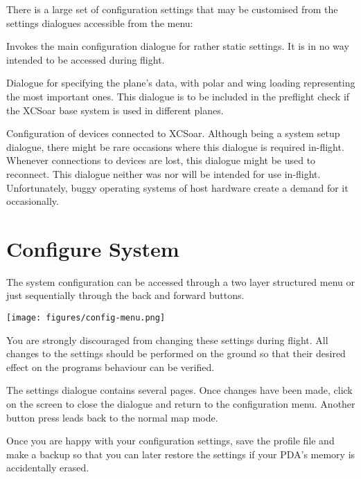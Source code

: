 There is a large set of configuration settings that may be customised
from the settings dialogues accessible from the menu:
\begin{jspecs}
\item[\bmenug{Config 2/3}\blink\bmenug{System}] Invokes the main configuration dialogue for rather static settings. It is in no way intended to be accessed during flight.
\item[\bmenug{Config 2/3}\blink\bmenug{Plane}] Dialogue for specifying the plane's data, with polar and wing loading representing the most important ones. This dialogue is to be included in the preflight check if the XCSoar base system is used in different planes.
\item[\bmenug{Config 2/3}\blink\bmenug{Devices}] Configuration of devices connected to XCSoar. Although being a system setup dialogue, there might be rare occasions where this dialogue is required in-flight.  Whenever connections to devices are lost, this dialogue might be used to reconnect. This dialogue neither was nor will be intended for use in-flight. Unfortunately, buggy operating systems of host hardware create a demand for it occasionally.
\end{jspecs}

\section{Configure System}
The system configuration can be accessed through a two layer structured menu 
or just sequentially through the back and forward buttons.

\begin{center}
\texttt{[image: figures/config-menu.png]}
\end{center}

You are strongly discouraged from changing these settings during
flight.  \warning  All changes to the settings should be performed on the ground
so that their desired effect on the programs behaviour can be
verified.

The settings dialogue contains several pages.  Once changes have been made,
click  on the screen to close the dialogue
and return to the configuration menu. Another button press leads back to 
the normal map mode.

\tip Once you are happy with your configuration settings, save the
profile file and make a backup so that you can later restore the
settings if your PDA's memory is accidentally erased.

